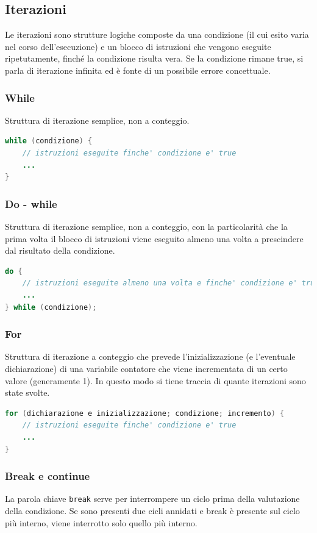 \documentclass{article}
\begin{document}
\subsection{Iterazioni}
Le iterazioni sono strutture logiche composte da una condizione (il cui esito varia nel corso dell'esecuzione) e un blocco di
istruzioni che vengono eseguite ripetutamente, finché la condizione risulta vera. Se la condizione rimane true, si parla di
iterazione infinita ed è fonte di un possibile errore concettuale.

\subsubsection*{While}
Struttura di iterazione semplice, non a conteggio.
\begin{lstlisting}[language=Java]
while (condizione) {
	// istruzioni eseguite finche' condizione e' true
	...
}
\end{lstlisting}

\subsubsection*{Do - while}
Struttura di iterazione semplice, non a conteggio, con la particolarità che la prima volta il blocco di istruzioni viene eseguito
almeno una volta a prescindere dal risultato della condizione.
\begin{lstlisting}[language=Java]
do {
	// istruzioni eseguite almeno una volta e finche' condizione e' true
	...
} while (condizione);
\end{lstlisting}

\subsubsection*{For}
Struttura di iterazione a conteggio che prevede l'inizializzazione (e l'eventuale dichiarazione) di una variabile contatore che
viene incrementata di un certo valore (generamente 1). In questo modo si tiene traccia di quante iterazioni sono state svolte.
\begin{lstlisting}[language=Java]
for (dichiarazione e inizializzazione; condizione; incremento) {
	// istruzioni eseguite finche' condizione e' true
	...
}
\end{lstlisting}

\subsubsection*{Break e continue}
La parola chiave \verb|break| serve per interrompere un ciclo prima della valutazione della condizione. Se sono presenti due cicli annidati
e break è presente sul ciclo più interno, viene interrotto solo quello più interno.
\end{document}
